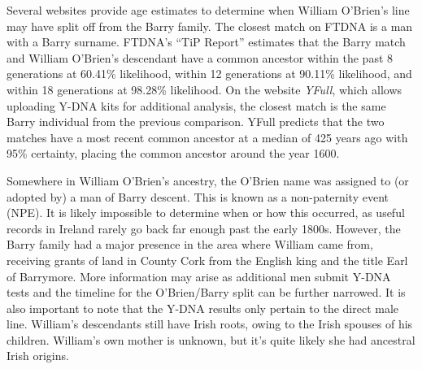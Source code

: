 Several websites provide age estimates to determine when William O'Bri\-en's line may have split off from the Barry family. The closest match on FTDNA is a man with a Barry surname. FTDNA's ``TiP Report'' estimates that the Barry match and William O'Brien's descendant have a common ancestor within the past 8 generations at 60.41\% likelihood, within 12 generations at 90.11\% likelihood, and within 18 generations at 98.28\% likelihood.\cite{TiP} On the website \textit{YFull}, which allows uploading Y-DNA kits for additional analysis, the closest match is the same Barry individual from the previous comparison. YFull predicts that the two matches have a most recent common ancestor at a median of 425 years ago with 95\% certainty, placing the common ancestor around the year 1600.\cite{YFull}

Somewhere in William O'Brien's ancestry, the O'Brien name was assigned to (or adopted by) a man of Barry descent. This is known as a non-paternity event (NPE). It is likely impossible to determine when or how this occurred, as useful records in Ireland rarely go back far enough past the early 1800s. However, the Barry family had a major presence in the area where William came from, receiving grants of land in County Cork from the English king and the title Earl of Barrymore.\cite{BarrymoreDNA3} More information may arise as additional men submit Y-DNA tests and the timeline for the O'Brien/Barry split can be further narrowed. It is also important to note that the Y-DNA results only pertain to the direct male line. William's descendants still have Irish roots, owing to the Irish spouses of his children. William's own mother is unknown, but it's quite likely she had ancestral Irish origins.
